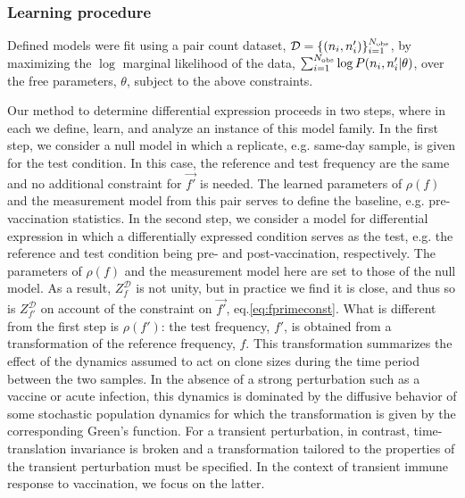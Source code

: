 \documentclass[letterpaper,english,prl,reprint,longbibliography]{revtex4-1} %
\begin{document}
\subsubsection*{Learning procedure}
Defined models were fit using a pair count dataset, $\mathcal{D}=\{(n_i,n'_i)\}_{i=1}^{N_{\textrm{\textrm{obs}}}}$, by maximizing the $\log$ marginal likelihood of the data, $\sum_{i=1}^{N_{\textrm{\textrm{obs}}}} \log P(n_i,n'_i|\theta)$, over the free parameters, $\theta$, subject to the above constraints.

Our method to determine differential expression proceeds in two steps, where in each we define, learn, and analyze an instance of this model family.
In the first step, we consider a null model in which a replicate, e.g. same-day sample, is given for the test condition. 
In this case, the reference and test frequency are the same and no additional constraint for $\vec{f'}$ is needed.
The learned parameters of $\rho(f)$ and the measurement model from this pair serves to define the baseline, e.g. pre-vaccination statistics.
In the second step, we consider a model for differential expression in which a differentially expressed condition serves as the test, e.g. the reference and test condition being pre- and post-vaccination, respectively. 
The parameters of $\rho(f)$ and the measurement model here are set to those of the null model. 
As a result, $Z^\mathcal{D}_f$ is not unity, but in practice we find it is close, and thus so is $Z^\mathcal{D}_{f'}$ on account of the constraint on $\vec{f'}$, eq.\ref{eq:fprimeconst}.  
What is different from the first step is $\rho(f')$: the test frequency, $f'$, is obtained from a transformation of the reference frequency, $f$.  
This transformation summarizes the effect of the dynamics assumed to act on clone sizes during the time period between the two samples. 
In the absence of a strong perturbation such as a vaccine or acute infection, this dynamics is dominated by the diffusive behavior of some stochastic population dynamics for which the transformation is given by the corresponding Green's function.  
For a transient perturbation, in contrast, time-translation invariance is broken and a transformation tailored to the properties of the transient perturbation must be specified. 
In the context of transient immune response to vaccination, we focus on the latter. 
\end{document}

